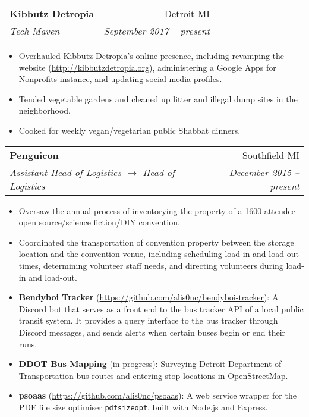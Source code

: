 \documentclass[letterpaper,10pt]{article}
\makeatletter
\newlength{\listsep}
\newcommand{\resitem}[1]{\item #1 \vspace{-2pt}}
\newcommand{\resheading}[1]{\vspace{4pt}
  \parbox{\textwidth}{
      \framebox[\textwidth][l]{
          {\textbf{\sffamily{\large #1}}}
      }
  }
}
\newcommand{\ressubheading}[4]{
\begin{tabular*}{\textwidth}{l@{\cftdotfill{\cftsecdotsep}\extracolsep{\fill}}r}
        \textbf{#1} & #2 \\
        \textit{#3} & \textit{#4} \\
\end{tabular*}\vspace{-6pt}}
\makeatother
\begin{document}
\resheading{Volunteer Experience}

\ressubheading{Kibbutz Detropia}{Detroit MI}{Tech Maven}{September 2017 -- present}
\begin{itemize} \itemsep \listsep \small
	\resitem{Overhauled Kibbutz Detropia's online presence, including revamping the website (\url{http://kibbutzdetropia.org}), administering a Google Apps for Nonprofits instance, and updating social media profiles.}
	\resitem{Tended vegetable gardens and cleaned up litter and illegal dump sites in the neighborhood.}
	\resitem{Cooked for weekly vegan/vegetarian public Shabbat dinners.}
\end{itemize}

\ressubheading{Penguicon}{Southfield MI}{Assistant Head of Logistics $\rightarrow$ Head of Logistics}{December 2015 -- present}
\begin{itemize} \itemsep \listsep \small
	\resitem{Oversaw the annual process of inventorying the property of a 1600-attendee open source/science fiction/DIY convention.}
	\resitem{Coordinated the transportation of convention property between the storage location and the convention venue, including scheduling load-in and load-out times, determining volunteer staff needs, and directing volunteers during load-in and load-out.}
\end{itemize}

\ifdef{\SHALEM}{\def\PROJECTS{}}{}

\resheading{Projects}

\vspace{-0.5\baselineskip}
\begin{itemize} \listsep
	\item {\bf Bendyboi Tracker} (\url{https://github.com/alis0nc/bendyboi-tracker}): A Discord bot that serves as a front end to the bus tracker API of a local public transit system. It provides a query interface to the bus tracker through Discord messages, and sends alerts when certain buses begin or end their runs.
    \item {\bf DDOT Bus Mapping} (in progress): Surveying Detroit Department of Transportation bus routes and entering stop locations in OpenStreetMap.
    \item {\bf psoaas} (\url{https://github.com/alis0nc/psoaas}): A web service wrapper for the PDF file size optimiser \texttt{pdfsizeopt}, built with Node.js and Express.
    
\end{itemize}
\end{document}
